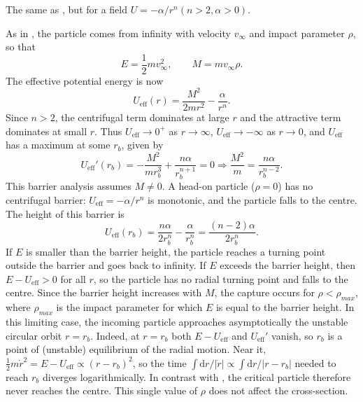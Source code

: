 
\begin{problem}[title={Fall to the centre in a field \texorplain{$-\alpha/r^n$, $n > 2$}{−α/rⁿ, n > 2}}]
{
The same as , but for a field $U=-\alpha/r^n \left(n > 2, \alpha >0 \right)$.
}
{
As in , the particle comes from infinity with velocity $v_\infty$ and impact parameter $\rho$, so that
\begin{equation*}
    E = \frac{1}{2}mv_\infty^2, \qquad M = mv_\infty\rho.
\end{equation*}
The effective potential energy is now
\begin{equation*}
    U_{\text{eff}}(r) = \frac{M^2}{2mr^2} - \frac{\alpha}{r^n}.
\end{equation*}
Since $n > 2$, the centrifugal term dominates at large $r$ and the attractive term dominates at small $r$. Thus $U_{\text{eff}} \to 0^+$ as $r \to \infty$, $U_{\text{eff}} \to -\infty$ as $r \to 0$, and $U_{\text{eff}}$ has a maximum at some $r_b$, given by
\begin{equation*}
    U_{\text{eff}}'(r_b) = -\frac{M^2}{mr_b^3} + \frac{n\alpha}{r_b^{n+1}} = 0 \Rightarrow \frac{M^2}{m} = \frac{n\alpha}{r_b^{n-2}}.
\end{equation*}
This barrier analysis assumes $M \neq 0$. A head-on particle ($\rho = 0$) has no centrifugal barrier: $U_{\text{eff}} = -\alpha/r^n$ is monotonic, and the particle falls to the centre.
The height of this barrier is
\begin{equation*}
    U_{\text{eff}}(r_b) = \frac{n\alpha}{2r_b^n} - \frac{\alpha}{r_b^n} = \frac{(n-2)\alpha}{2r_b^n}.
\end{equation*}
If $E$ is smaller than the barrier height, the particle reaches a turning point outside the barrier and goes back to infinity. If $E$ exceeds the barrier height, then $E - U_{\text{eff}} > 0$ for all $r$, so the particle has no radial turning point and falls to the centre. Since the barrier height increases with $M$, the capture occurs for $\rho < \rho_{max}$, where $\rho_{max}$ is the impact parameter for which $E$ is equal to the barrier height. In this limiting case, the incoming particle approaches asymptotically the unstable circular orbit $r = r_b$. Indeed, at $r = r_b$ both $E - U_{\text{eff}}$ and $U_{\text{eff}}'$ vanish, so $r_b$ is a point of (unstable) equilibrium of the radial motion. Near it, $\frac{1}{2}m\dot{r}^2 = E - U_{\text{eff}} \propto (r - r_b)^2$, so the time $\int \mathrm{d}r/|\dot{r}| \propto \int \mathrm{d}r/|r - r_b|$ needed to reach $r_b$ diverges logarithmically. In contrast with , the critical particle therefore never reaches the centre. This single value of $\rho$ does not affect the cross-section.

}
\end{problem}
